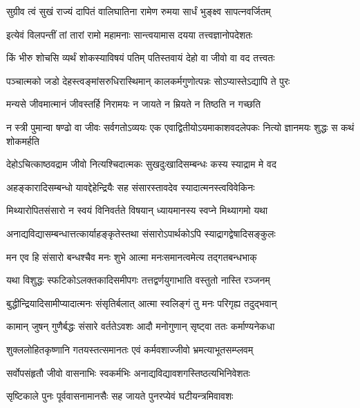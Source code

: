 \twolineshloka
{सुग्रीव त्वं सुखं राज्यं दापितं वालिघातिना}
{रामेण रुमया सार्धं भुङ्क्ष्व सापत्नवर्जितम्} %

\twolineshloka
{इत्येवं विलपन्तीं तां तारां रामो महामनाः}
{सान्त्वयामास दयया तत्त्वज्ञानोपदेशतः} %

\twolineshloka
{किं भीरु शोचसि व्यर्थं शोकस्याविषयं पतिम्}
{पतिस्तवायं देहो वा जीवो वा वद तत्त्वतः} %

\twolineshloka
{पञ्चात्मको जडो देहस्त्वङ्मांसरुधिरास्थिमान्}
{कालकर्मगुणोत्पन्नः सोऽप्यास्तेऽद्यापि ते पुरः} %

\twolineshloka
{मन्यसे जीवमात्मानं जीवस्तर्हि निरामयः}
{न जायते न म्रियते न तिष्ठति न गच्छति} %

\threelineshloka
{न स्त्री पुमान्वा षण्ढो वा जीवः सर्वगतोऽव्ययः}
{एक एवाद्वितीयोऽयमाकाशवदलेपकः}
{नित्यो ज्ञानमयः शुद्धः स कथं शोकमर्हति} %


\twolineshloka
{देहोऽचित्काष्ठवद्राम जीवो नित्यश्चिदात्मकः}
{सुखदुःखादिसम्बन्धः कस्य स्याद्राम मे वद} %


\twolineshloka
{अहङ्कारादिसम्बन्धो यावद्देहेन्द्रियैः सह}
{संसारस्तावदेव स्यादात्मनस्त्वविवेकिनः} %

\twolineshloka
{मिथ्यारोपितसंसारो न स्वयं विनिवर्तते}
{विषयान् ध्यायमानस्य स्वप्ने मिथ्यागमो यथा} %

\twolineshloka
{अनाद्यविद्यासम्बन्धात्तत्कार्याहङ्कृतेस्तथा}
{संसारोऽपार्थकोऽपि स्याद्रागद्वेषादिसङ्कुलः} %

\twolineshloka
{मन एव हि संसारो बन्धश्चैव मनः शुभे}
{आत्मा मनःसमानत्वमेत्य तद्गतबन्धभाक्} %

\twolineshloka
{यथा विशुद्धः स्फटिकोऽलक्तकादिसमीपगः}
{तत्तद्वर्णयुगाभाति वस्तुतो नास्ति रञ्जनम्} %

\twolineshloka
{बुद्धीन्द्रियादिसामीप्यादात्मनः संसृतिर्बलात्}
{आत्मा स्वलिङ्गं तु मनः परिगृह्य तदुद्भवान्} %

\twolineshloka
{कामान् जुषन् गुणैर्बद्धः संसारे वर्ततेऽवशः}
{आदौ मनोगुणान् सृष्ट्वा ततः कर्माण्यनेकधा} %

\twolineshloka
{शुक्ललोहितकृष्णानि गतयस्तत्समानतः}
{एवं कर्मवशाज्जीवो भ्रमत्याभूतसम्प्लवम्} %

\twolineshloka
{सर्वोपसंहृतौ जीवो वासनाभिः स्वकर्मभिः}
{अनाद्यविद्यावशगस्तिष्ठत्यभिनिवेशतः} %

\twolineshloka
{सृष्टिकाले पुनः पूर्ववासनामानसैः सह}
{जायते पुनरप्येवं घटीयन्त्रमिवावशः} %

